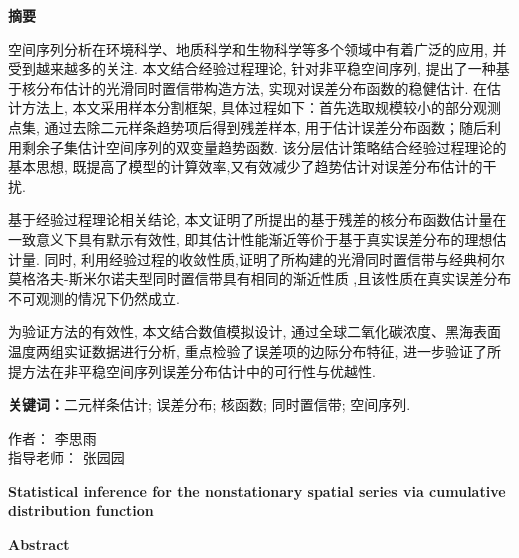 \newpage %
\thispagestyle{fancy} %
\begin{center}
  {\Large \bf 摘要}
  
\end{center}

空间序列分析在环境科学、地质科学和生物科学等多个领域中有着广泛的应用, 并受到越来越多的关注. 本文结合经验过程理论, 针对非平稳空间序列, 提出了一种基于核分布估计的光滑同时置信带构造方法, 实现对误差分布函数的稳健估计. 在估计方法上, 本文采用样本分割框架, 具体过程如下：首先选取规模较小的部分观测点集, 通过去除二元样条趋势项后得到残差样本, 用于估计误差分布函数；随后利用剩余子集估计空间序列的双变量趋势函数. 该分层估计策略结合经验过程理论的基本思想, 既提高了模型的计算效率,又有效减少了趋势估计对误差分布估计的干扰.

基于经验过程理论相关结论, 本文证明了所提出的基于残差的核分布函数估计量在一致意义下具有默示有效性, 即其估计性能渐近等价于基于真实误差分布的理想估计量. 同时, 利用经验过程的收敛性质,证明了所构建的光滑同时置信带与经典柯尔莫格洛夫-斯米尔诺夫型同时置信带具有相同的渐近性质 ,且该性质在真实误差分布不可观测的情况下仍然成立.

为验证方法的有效性, 本文结合数值模拟设计, 通过全球二氧化碳浓度、黑海表面温度两组实证数据进行分析, 重点检验了误差项的边际分布特征, 进一步验证了所提方法在非平稳空间序列误差分布估计中的可行性与优越性.

{\bf 关键词：}二元样条估计; 误差分布; 核函数; 同时置信带; 空间序列.
\begin{flushright}
  作者： 李思雨\\
指导老师： 张园园
\end{flushright}

\newpage %
\thispagestyle{fancy}
\begin{center}
  {\Large \bf  Statistical inference for the nonstationary spatial series via cumulative distribution function }
\end{center}


\begin{center}

  { \bf  Abstract }
\end{center}

